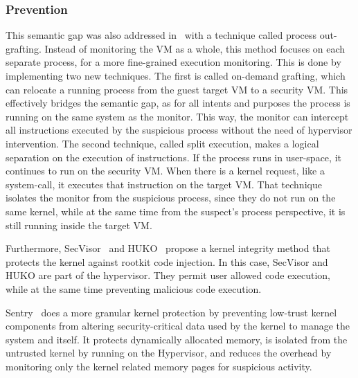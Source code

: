 \subsubsection{Prevention}

\par This semantic gap was also addressed in~\cite{srinivasan2011process} with a technique called process out-grafting. Instead of monitoring the \ac{VM} as a whole, this method focuses on each separate process, for a more fine-grained execution monitoring. This is done by implementing two new techniques. The first is called on-demand grafting, which can relocate a running process from the guest target \ac{VM} to a security \ac{VM}. This effectively bridges the semantic gap, as for all intents and purposes the process is running on the same system as the monitor. This way, the monitor can intercept all instructions executed by the suspicious process without the need of hypervisor intervention. The second technique, called split execution, makes a logical separation on the execution of instructions. If the process runs in user-space, it continues to run on the security \ac{VM}. When there is a kernel request, like a system-call, it executes that instruction on the target \ac{VM}. That technique isolates the monitor from the suspicious process, since they do not run on the same kernel, while at the same time from the suspect’s process perspective, it is still running inside the target \ac{VM}. 

\par Furthermore, SecVisor~\cite{seshadri2007secvisor} and HUKO~\cite{xiong2011practical} propose a kernel integrity method that protects the kernel against rootkit code injection. In this case, SecVisor and HUKO are part of the hypervisor. They permit user allowed code execution, while at the same time preventing malicious code execution.


\par Sentry~\cite{srivastava2012efficient} does a more granular kernel protection by preventing low-trust kernel components from altering security-critical data used by the kernel to manage the system and itself. It protects dynamically allocated memory, is isolated from the untrusted kernel by running on the Hypervisor, and reduces the overhead by monitoring only the kernel related memory pages for suspicious activity.


